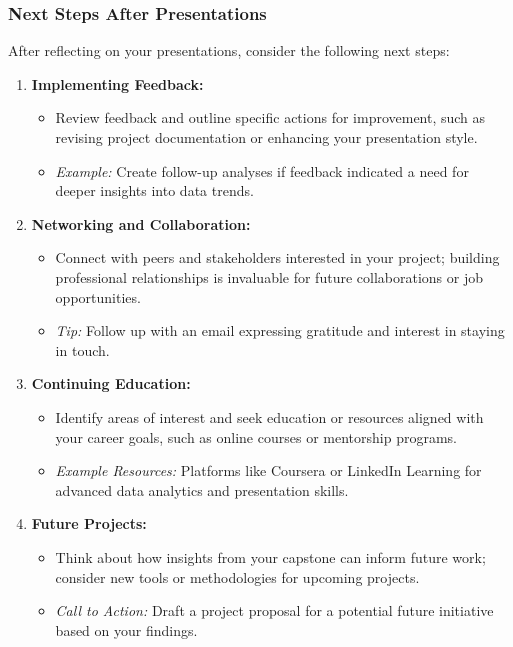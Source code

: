 \documentclass{beamer}
\begin{document}
\begin{frame}[fragile]
    \frametitle{Next Steps After Presentations}
    After reflecting on your presentations, consider the following next steps:
    
    \begin{enumerate}
        \item \textbf{Implementing Feedback:}
        \begin{itemize}
            \item Review feedback and outline specific actions for improvement, such as revising project documentation or enhancing your presentation style.
            \item \textit{Example:} Create follow-up analyses if feedback indicated a need for deeper insights into data trends.
        \end{itemize}
        
        \item \textbf{Networking and Collaboration:}
        \begin{itemize}
            \item Connect with peers and stakeholders interested in your project; building professional relationships is invaluable for future collaborations or job opportunities.
            \item \textit{Tip:} Follow up with an email expressing gratitude and interest in staying in touch.
        \end{itemize}
        
        \item \textbf{Continuing Education:}
        \begin{itemize}
            \item Identify areas of interest and seek education or resources aligned with your career goals, such as online courses or mentorship programs.
            \item \textit{Example Resources:} Platforms like Coursera or LinkedIn Learning for advanced data analytics and presentation skills.
        \end{itemize}
        
        \item \textbf{Future Projects:}
        \begin{itemize}
            \item Think about how insights from your capstone can inform future work; consider new tools or methodologies for upcoming projects.
            \item \textit{Call to Action:} Draft a project proposal for a potential future initiative based on your findings.
        \end{itemize}
    \end{enumerate}
\end{frame}
\end{document}
